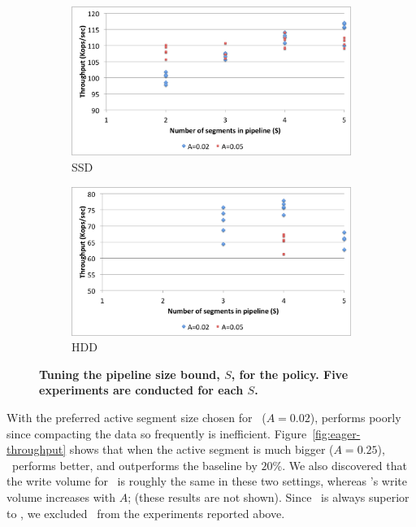 \begin{figure}[tb]

  \centering
  
  \begin{subfigure}[t]{\columnwidth}
      \includegraphics[width=\figw]{Figs/pipeline-1-ssd.png}
      \caption[]{SSD}
    \label{fig:pipeline:ssd}  
  \end{subfigure}   
  \begin{subfigure}[t]{\columnwidth}
      \includegraphics[width=\figw]{Figs/pipeline-1-hdd.png}
      \caption[]{HDD}
    \label{fig:pipeline:hdd}
  \end{subfigure}

\caption{\textbf{Tuning the pipeline size bound, $S$, for the \basic\/ policy. Five experiments are conducted for each $S$.} }
\label{fig:pipeline}
\end{figure}

With the preferred active segment size chosen for \basic\ ($A=0.02$), \eager\/ performs poorly since compacting the data so frequently is inefficient. 
Figure~\ref{fig:eager-throughput} shows that when the active segment is much bigger ($A=0.25$), \eager\ performs better, and outperforms the 
baseline by $20$\%. We also discovered that the write volume for \eager\ is roughly the same in these two settings, whereas \basic's write volume 
increases with $A$; (these results are not shown).  
Since \adp\ is always superior to \eager, we excluded \eager\ from the experiments reported above.  

